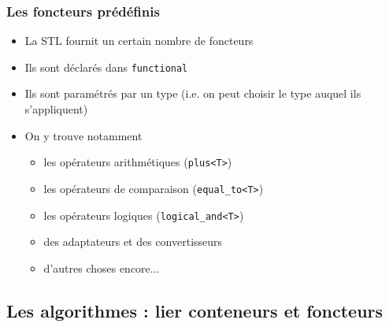\begin{frame}[fragile]\frametitle{Les foncteurs prédéfinis}

\begin{itemize}
\itemsep1pt\parskip0pt
\item
  La STL fournit un certain nombre de foncteurs
\item
  Ils sont déclarés dans \verb|functional| 
  \item Ils sont paramétrés par un type (i.e. on peut choisir le type auquel ils s'appliquent)
\item
  On y trouve notamment

  \begin{itemize}
  \itemsep1pt\parskip0pt
  \item
    les opérateurs arithmétiques (\verb|plus<T>|)
  \item
    les opérateurs de comparaison (\verb|equal_to<T>|)
  \item
    les opérateurs logiques (\verb|logical_and<T>|)
  \item
    des adaptateurs et des convertisseurs
  \item
    d'autres choses encore...
  \end{itemize}
\end{itemize}

\end{frame}

\subsection{Les algorithmes : lier conteneurs et foncteurs}

